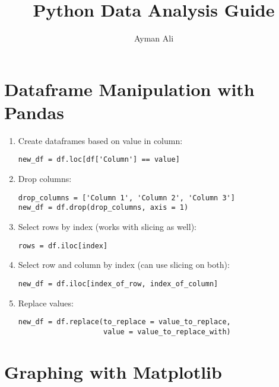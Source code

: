 \documentclass{article}
\begin{document}
\title{%
    Python Data Analysis Guide \\
}
\author{Ayman Ali}
\date{}
\maketitle


\tableofcontents

\clearpage

\section{Dataframe Manipulation with Pandas}
\begin{enumerate}
    \item Create dataframes based on value in column:
    \begin{verbatim}
new_df = df.loc[df['Column'] == value]
    \end{verbatim}
    \item Drop columns:
    \begin{verbatim}
drop_columns = ['Column 1', 'Column 2', 'Column 3']
new_df = df.drop(drop_columns, axis = 1)
    \end{verbatim}
    \item Select rows by index (works with slicing as well):
    \begin{verbatim}
rows = df.iloc[index]
    \end{verbatim}
    \item Select row and column by index (can use slicing on both):
    \begin{verbatim}
new_df = df.iloc[index_of_row, index_of_column]
    \end{verbatim}
    \item Replace values:
    \begin{verbatim}
new_df = df.replace(to_replace = value_to_replace,
                    value = value_to_replace_with)
    \end{verbatim}
\end{enumerate}

\section{Graphing with Matplotlib}
\end{document}
